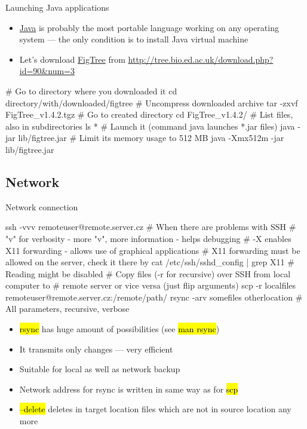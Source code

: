\documentclass[compress, ucs, xelatex, 11pt, xcolor=svgnames,
  hyperref={
    bookmarks=true,
    unicode=true,
    colorlinks=true,
    pdftitle={Linux, command line and MetaCentrum},
    plainpages=false,
    pdfauthor={Vojtech Zeisek},
    pdfsubject={Course about use of Linux command line, writing shell scripts and using MetaCentrum of CESNET},
    pdfcreator={XeLaTeX, http://www.xelatex.org/},
    pdfkeywords={Linux, GNU, BASH, shell, command line, MetaCentrum},
    linkcolor=Sienna,
    anchorcolor=black,
    citecolor=green,
    filecolor=magenta,
    menucolor=Sienna,
    urlcolor=cyan,
    pdftex},
  url={hyphens, lowtilde} %
  ]{beamer}
\renewcommand{\texttt}[1]{\hl{\ttfamily #1}}
\begin{document}
\begin{frame}[fragile]{Launching Java applications}
\begin{itemize}
  \item \href{https://www.java.com/}{Java} is probably the most portable language working on any operating system --- the only condition is to install Java virtual machine
  \item Let's download \href{http://tree.bio.ed.ac.uk/software/figtree/}{FigTree} from \url{http://tree.bio.ed.ac.uk/download.php?id=90&num=3}
\end{itemize}
  \begin{bashcode}
    # Go to directory where you downloaded it
    cd directory/with/downloaded/figtree
    # Uncompress downloaded archive
    tar -zxvf FigTree_v1.4.2.tgz
    # Go to created directory
    cd FigTree_v1.4.2/
    # List files, also in subdirectories
    ls *
    # Launch it (command java launches *.jar files)
    java -jar lib/figtree.jar
    # Limit its memory usage to 512 MB
    java -Xmx512m -jar lib/figtree.jar
  \end{bashcode}
\end{frame}

\subsection{Network}

\begin{frame}[fragile]{Network connection}
  \begin{bashcode}
    ssh -vvv remoteuser@remote.server.cz # When there are problems with SSH
      # "v" for verbosity - more "v", more information - helps debugging
      # -X enables X11 forwarding - allows use of graphical applications
      # X11 forwarding must be allowed on the server, check it there by
    cat /etc/ssh/sshd_config | grep X11 # Reading might be disabled
    # Copy files (-r for recursive) over SSH from local computer to
    # remote server or vice versa (just flip arguments)
    scp -r localfiles remoteuser@remote.server.cz:/remote/path/
    rsync -arv somefiles otherlocation # All parameters, recursive, verbose
  \end{bashcode}
\begin{itemize}
  \item \texttt{rsync} has huge amount of possibilities (see \texttt{man rsync})
  \item It transmits only changes --- very efficient
  \item Suitable for local as well as network backup
  \item Network address for rsync is written in same way as for \texttt{scp}
  \item \texttt{--delete} deletes in target location files which are not in source location any more
\end{itemize}
\end{frame}
\end{document}
